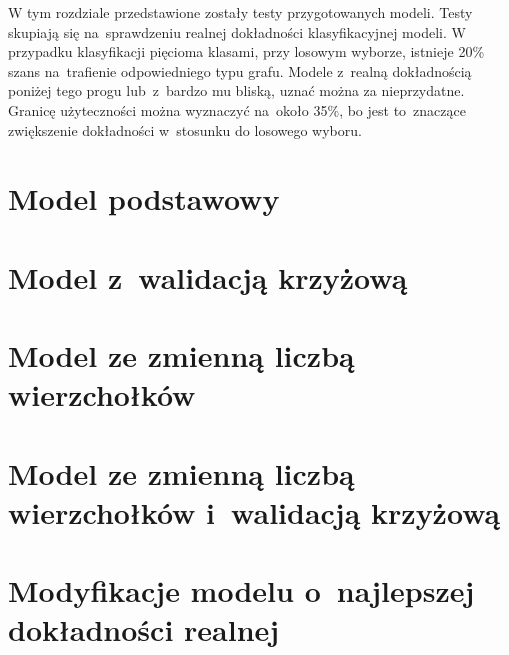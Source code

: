 W tym rozdziale przedstawione zostały testy przygotowanych modeli.
Testy skupiają się na~sprawdzeniu realnej dokładności klasyfikacyjnej modeli.
W przypadku klasyfikacji pięcioma klasami, przy losowym wyborze, istnieje 20\% szans na~trafienie odpowiedniego typu grafu.
Modele z~realną dokładnością poniżej tego progu lub~z~bardzo mu bliską, uznać można za nieprzydatne.
Granicę użyteczności można wyznaczyć na~około 35\%, bo jest to~znaczące zwiększenie dokładności w~stosunku do losowego wyboru.

\section{Model podstawowy}


\section{Model z~walidacją krzyżową}


\section{Model ze zmienną liczbą wierzchołków}


\section{Model ze zmienną liczbą wierzchołków i~walidacją krzyżową}


\section{Modyfikacje modelu o~najlepszej dokładności realnej}
